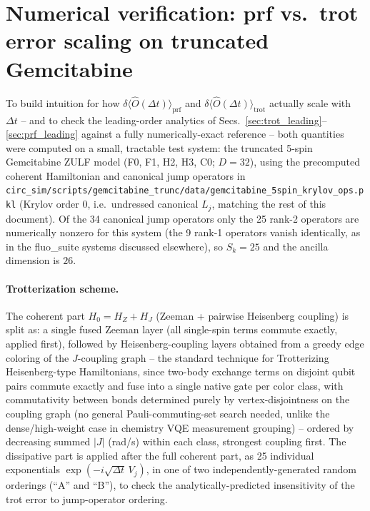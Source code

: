 \documentclass[11pt]{article}
\newcommand{\Dt}{\Delta t}
\begin{document}
\section{Numerical verification: prf vs.\ trot error scaling on truncated Gemcitabine}
\label{sec:numerical_verification}

To build intuition for how $\delta\langle\hat{O}(\Dt)\rangle_{\text{prf}}$ and $\delta\langle\hat{O}(\Dt)\rangle_{\text{trot}}$ actually scale with $\Dt$ -- and to check the leading-order analytics of Secs.~\ref{sec:trot_leading}--\ref{sec:prf_leading} against a fully numerically-exact reference -- both quantities were computed on a small, tractable test system: the truncated 5-spin Gemcitabine ZULF model (F0, F1, H2, H3, C0; $D=32$), using the precomputed coherent Hamiltonian and canonical jump operators in \texttt{circ\_sim/scripts/gemcitabine\_trunc/data/gemcitabine\_5spin\_krylov\_ops.pkl} (Krylov order 0, i.e.\ undressed canonical $L_j$, matching the rest of this document). Of the 34 canonical jump operators only the 25 rank-2 operators are numerically nonzero for this system (the 9 rank-1 operators vanish identically, as in the fluo\_suite systems discussed elsewhere), so $S_k=25$ and the ancilla dimension is $26$.

\paragraph{Trotterization scheme.} The coherent part $H_0=H_Z+H_J$ (Zeeman + pairwise Heisenberg coupling) is split as: a single fused Zeeman layer (all single-spin terms commute exactly, applied first), followed by Heisenberg-coupling layers obtained from a greedy edge coloring of the $J$-coupling graph -- the standard technique for Trotterizing Heisenberg-type Hamiltonians, since two-body exchange terms on disjoint qubit pairs commute exactly and fuse into a single native gate per color class, with commutativity between bonds determined purely by vertex-disjointness on the coupling graph (no general Pauli-commuting-set search needed, unlike the dense/high-weight case in chemistry VQE measurement grouping) -- ordered by decreasing summed $|J|$ (rad/s) within each class, strongest coupling first. The dissipative part is applied after the full coherent part, as 25 individual exponentials $\exp(-i\sqrt{\Dt}\,V_j)$, in one of two independently-generated random orderings (``A'' and ``B''), to check the analytically-predicted insensitivity of the trot error to jump-operator ordering.
\end{document}

